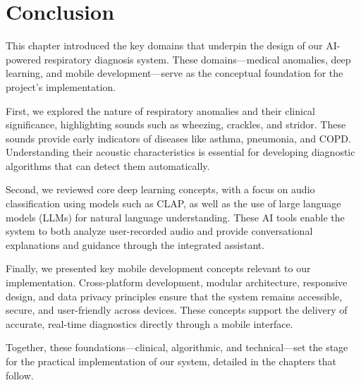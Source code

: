\section*{Conclusion}

\label{sec:chapter2_conclusion}

This chapter introduced the key domains that underpin the design of our AI-powered respiratory diagnosis system. These domains—medical anomalies, deep learning, and mobile development—serve as the conceptual foundation for the project's implementation.

First, we explored the nature of respiratory anomalies and their clinical significance, highlighting sounds such as wheezing, crackles, and stridor. These sounds provide early indicators of diseases like asthma, pneumonia, and COPD. Understanding their acoustic characteristics is essential for developing diagnostic algorithms that can detect them automatically.

Second, we reviewed core deep learning concepts, with a focus on audio classification using models such as CLAP, as well as the use of large language models (LLMs) for natural language understanding. These AI tools enable the system to both analyze user-recorded audio and provide conversational explanations and guidance through the integrated assistant.

Finally, we presented key mobile development concepts relevant to our implementation. Cross-platform development, modular architecture, responsive design, and data privacy principles ensure that the system remains accessible, secure, and user-friendly across devices. These concepts support the delivery of accurate, real-time diagnostics directly through a mobile interface.

Together, these foundations—clinical, algorithmic, and technical—set the stage for the practical implementation of our system, detailed in the chapters that follow.
